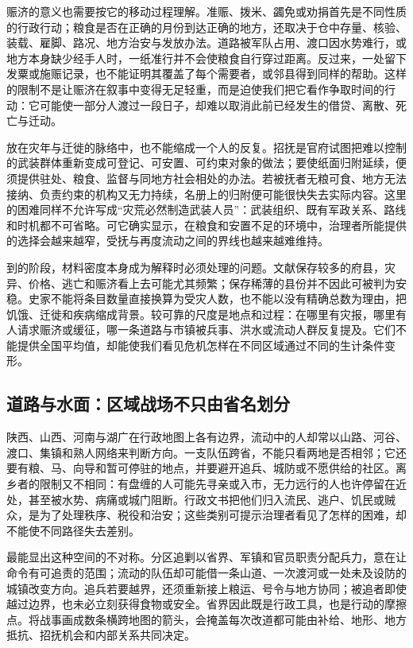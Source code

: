 赈济的意义也需要按它的移动过程理解。准赈、拨米、蠲免或劝捐首先是不同性质的行政行动；粮食是否在正确的月份到达正确的地方，还取决于仓中存量、核验、装载、雇脚、路况、地方治安与发放办法。道路被军队占用、渡口因水势难行，或地方本身缺少经手人时，一纸准行并不会使粮食自行穿过距离。反过来，一处留下发粟或施赈记录，也不能证明其覆盖了每个需要者，或邻县得到同样的帮助。这样的限制不是让赈济在叙事中变得无足轻重，而是迫使我们把它看作争取时间的行动：它可能使一部分人渡过一段日子，却难以取消此前已经发生的借贷、离散、死亡与迁动。

放在灾年与迁徙的脉络中，也不能缩成一个人的反复。招抚是官府试图把难以控制的武装群体重新变成可登记、可安置、可约束对象的做法；要使纸面归附延续，便须提供驻处、粮食、监督与同地方社会相处的办法。若被抚者无粮可食、地方无法接纳、负责约束的机构又无力持续，名册上的归附便可能很快失去实际内容。这里的困难同样不允许写成“灾荒必然制造武装人员”：武装组织、既有军政关系、路线和时机都不可省略。可它确实显示，在粮食和安置不足的环境中，治理者所能提供的选择会越来越窄，受抚与再度流动之间的界线也越来越难维持。

到的阶段，材料密度本身成为解释时必须处理的问题。文献保存较多的府县，灾异、价格、逃亡和赈济看上去可能尤其频繁；保存稀薄的县份并不因此可被判为安稳。史家不能将条目数量直接换算为受灾人数，也不能以没有精确总数为理由，把饥饿、迁徙和疾病缩成背景。较可靠的尺度是地点和过程：在哪里有灾报，哪里有人请求赈济或缓征，哪一条道路与市镇被兵事、洪水或流动人群反复提及。它们不能提供全国平均值，却能使我们看见危机怎样在不同区域通过不同的生计条件变形。

\subsection{道路与水面：区域战场不只由省名划分}

陕西、山西、河南与湖广在行政地图上各有边界，流动中的人却常以山路、河谷、渡口、集镇和熟人网络来判断方向。一支队伍跨省，不能只看两地是否相邻；它还要有粮、马、向导和暂可停驻的地点，并要避开追兵、城防或不愿供给的社区。离乡者的限制又不相同：有盘缠的人可能先寻亲或入市，无力远行的人也许停留在近处，甚至被水势、病痛或城门阻断。行政文书把他们归入流民、逃户、饥民或贼众，是为了处理秩序、税役和治安；这些类别可提示治理者看见了怎样的困难，却不能使不同路径失去差别。

最能显出这种空间的不对称。分区追剿以省界、军镇和官员职责分配兵力，意在让命令有可追责的范围；流动的队伍却可能借一条山道、一次渡河或一处未及设防的城镇改变方向。追兵若要越界，还须重新接上粮运、号令与地方协同；被追者即使越过边界，也未必立刻获得食物或安全。省界因此既是行政工具，也是行动的摩擦点。将战事画成数条横跨地图的箭头，会掩盖每次改道都可能由补给、地形、地方抵抗、招抚机会和内部关系共同决定。

